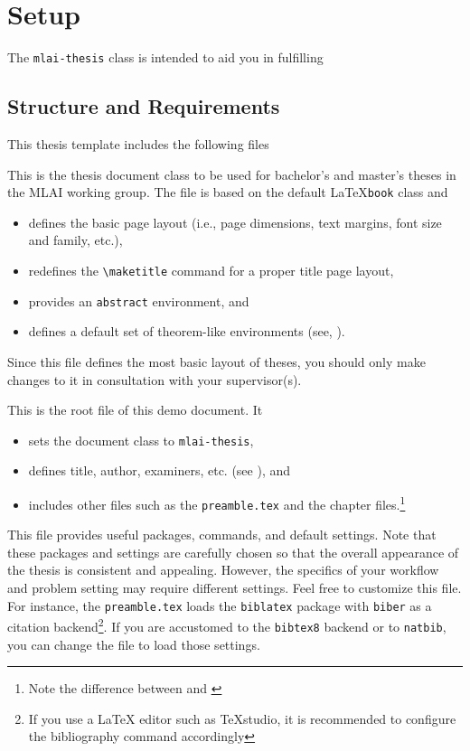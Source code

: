 \chapter{Setup}

The \texttt{mlai-thesis} class is intended to aid you in fulfilling 

\section{Structure and Requirements} 

This thesis template includes the following files 

\begin{description}[font=\normalfont\ttfamily]
	\item[mlai-thesis.cls] This is the thesis document class to be used for 
	bachelor's and master's theses in the MLAI working group. The file is based 
	on the default \LaTeX \texttt{book} class and  
	\begin{itemize}
		\item defines the basic page layout (i.e., page dimensions, text 
		margins, font size and family, etc.), 
		\item redefines the \verb|\maketitle| command for a 
		proper title page layout, 
		\item provides an \texttt{abstract} environment, and 
		\item defines a default set of theorem-like environments (see, ). 
	\end{itemize}
	Since this file defines the most basic layout of theses, you should only make changes to it in consultation with your supervisor(s). 
	\item[thesis.tex] This is the root file of this demo document. It 
	\begin{itemize}
		\item sets the document class to \texttt{mlai-thesis},
		\item defines title, author, examiners, etc. (see ), and 
		\item includes other files such as the \texttt{preamble.tex} and the chapter files.\VerbatimFootnotes\footnote{ Note the difference between \verb|| and \verb||}
	\end{itemize}
	\item[preamble.tex] This file provides useful packages, commands, and default settings. Note that these packages and settings are carefully chosen so that the overall appearance of the thesis is consistent and appealing. However, the specifics of your workflow and problem setting may require different settings. Feel free to customize this file. For instance, the \texttt{preamble.tex} loads the \texttt{biblatex} package with \texttt{biber} as a citation backend\footnote{If you use a \LaTeX{} editor such as TeXstudio, it is recommended to configure the bibliography command accordingly}. If you are accustomed to the \texttt{bibtex8} backend or to \texttt{natbib}, you can change the file to load those settings. 

\end{description}
